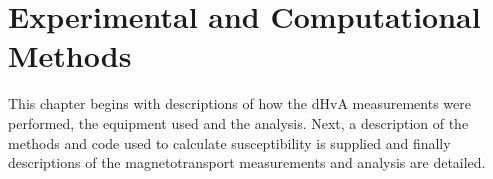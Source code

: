 \chapter{Experimental and Computational\\Methods}

\begin{chapterabstract}
This chapter begins with descriptions of how the \ac{dHvA} measurements were performed, the equipment used and the analysis. Next, a description of the methods and code used to calculate susceptibility is supplied and finally descriptions of the magnetotransport measurements and analysis are detailed.
\end{chapterabstract}









